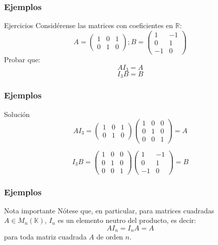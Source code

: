 \documentclass[aspectratio=169]{beamer}
\begin{document}
 
 
    \begin{frame}
  \frametitle{Ejemplos}
  
   \begin{block}{Ejercicios}
   Consid\'erense las matrices con coeficientes en $\mathbb{R}$:
  \[
  A = \left(\begin{array}{ccc}1 & 0 & 1 \\0 & 1 & 0\end{array}\right);
  B = \left(\begin{array}{cc}1 & -1 \\0 & 1 \\-1 & 0\end{array}\right)
  \]
  Probar que:
   \[AI_3 = A \]\[ I_3B = B \]

  \end{block}
 \end{frame} 


     \begin{frame}
  \frametitle{Ejemplos}
  
   \begin{block}{Soluci\'on}
  \[ AI_3= \left(\begin{array}{ccc}1 & 0 & 1 \\0 & 1 & 0\end{array}\right) 
  	\left(\begin{array}{ccc}1 & 0&0 \\0 & 1 &0 \\0 & 0 &1\end{array}\right) =
	A
  \]

  \[ I_3B =\left(\begin{array}{ccc}1 & 0&0 \\0 & 1 &0 \\0 & 0 &1\end{array}\right)
  \left(\begin{array}{cc}1 & -1 \\0 & 1 \\-1 & 0\end{array}\right) = B
  \]
  \end{block}


 \end{frame} 
 
 
      \begin{frame}
  \frametitle{Ejemplos}
  
   \begin{block}{Nota importante}
N\'otese que, en particular, para matrices cuadradas $A\in M_n(\mathbb{K})$, $I_n$ es un elemento neutro del producto, es decir:
\[AI_n = I_nA = A\]
para toda matriz cuadrada $A$ de orden $n$.
  \end{block}


 \end{frame} 
 
\end{document}
